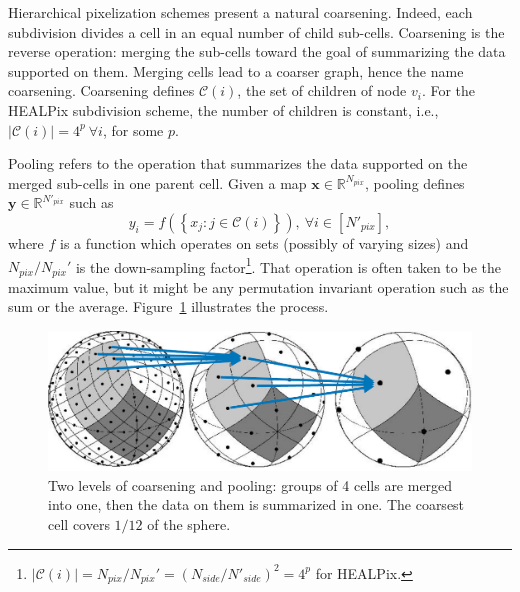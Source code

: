 \documentclass[final,twocolumn,3p,times,authoryear]{elsarticle}
\newcommand{\figref}[1]{Figure~\ref{fig:#1}}
\renewcommand{\b}[1]{{\bm{#1}}}   %
\newcommand{\1}{\b{1}}              %
\newcommand{\0}{\b{0}}              %
\newcommand{\C}{\mathcal{C}}
\newcommand{\x}{\b{x}}
\newcommand{\y}{\b{y}}
\newcommand{\R}{\mathbb{R}}
\begin{document}
Hierarchical pixelization schemes present a natural coarsening. Indeed, each subdivision divides a cell in an equal number of child sub-cells. Coarsening is the reverse operation: merging the sub-cells toward the goal of summarizing the data supported on them. Merging cells lead to a coarser graph, hence the name coarsening. Coarsening defines $\C(i)$, the set of children of node $v_i$. For the HEALPix subdivision scheme, the number of children is constant, i.e., $| \C(i) | = 4^p \ \forall i$, for some $p$.

Pooling refers to the operation that summarizes the data supported on the merged sub-cells in one parent cell. Given a map $\x \in \R^{N_{pix}}$, pooling defines $\y \in \R^{N'_{pix}}$ such as
\begin{equation} \label{eqn:pooling}
	y_i = f \left( \left\{ x_j : j \in \C(i) \right\} \right), \ \forall i \in [N'_{pix}],
\end{equation}
where $f$ is a function which operates on sets (possibly of varying sizes) and $N_{pix} / {N_{pix}}'$ is the down-sampling factor\footnote{$| \C(i) | = N_{pix} / {N_{pix}}' = (N_{side} / N'_{side})^2 = 4^p$ for HEALPix.}. That operation is often taken to be the maximum value, but it might be any permutation invariant operation such as the sum or the average. \figref{pooling} illustrates the process.


\begin{figure}
	\centering
	\includegraphics[width=\linewidth]{pooling}
	\caption{Two levels of coarsening and pooling: groups of 4 cells are merged into one, then the data on them is summarized in one. The coarsest cell covers $1/12$ of the sphere.}
	\label{fig:pooling}
\end{figure}
\end{document}
